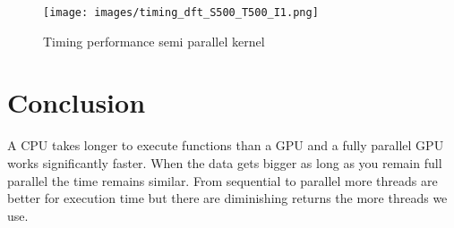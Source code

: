 \begin{figure}[H]
    \centering
    \texttt{[image: images/timing\_dft\_S500\_T500\_I1.png]}
    \caption{Timing performance semi parallel kernel}
    \label{figure:timing_dft_S500_T500_I1}
\end{figure}

\section{Conclusion}
\label{sec:conclusion}
A CPU takes longer to execute functions than a GPU and a fully parallel GPU works significantly faster. When the data gets bigger as long as you remain full parallel the time remains similar. From sequential to parallel more threads are better for execution time but there are diminishing returns the more threads we use.

